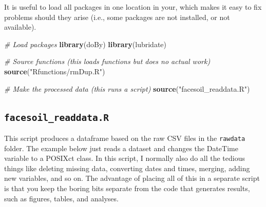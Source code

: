 \documentclass[]{book}
\newenvironment{Shaded}{\begin{snugshade}}{\end{snugshade}}
\newcommand{\CommentTok}[1]{\textcolor[rgb]{0.56,0.35,0.01}{\textit{#1}}}
\newcommand{\KeywordTok}[1]{\textcolor[rgb]{0.13,0.29,0.53}{\textbf{#1}}}
\newcommand{\NormalTok}[1]{#1}
\newcommand{\OperatorTok}[1]{\textcolor[rgb]{0.81,0.36,0.00}{\textbf{#1}}}
\newcommand{\StringTok}[1]{\textcolor[rgb]{0.31,0.60,0.02}{#1}}
\begin{document}
It is useful to load all packages in one location in your, which makes it easy to fix problems should they arise (i.e., some packages are not installed, or not available).

\begin{Shaded}
\begin{Highlighting}[]
\CommentTok{# Load packages}
\KeywordTok{library}\NormalTok{(doBy)}
\KeywordTok{library}\NormalTok{(lubridate)}

\CommentTok{# Source functions (this loads functions but does no actual work)}
\KeywordTok{source}\NormalTok{(}\StringTok{"Rfunctions/rmDup.R"}\NormalTok{)}

\CommentTok{# Make the processed data (this runs a script)}
\KeywordTok{source}\NormalTok{(}\StringTok{"facesoil_readdata.R"}\NormalTok{)}
\end{Highlighting}
\end{Shaded}

\hypertarget{facesoil_readdata.r}{%
\subsection{\texorpdfstring{\texttt{facesoil\_readdata.R}}{facesoil\_readdata.R}}\label{facesoil_readdata.r}}

This script produces a dataframe based on the raw CSV files in the \texttt{rawdata} folder. The example below just reads a dataset and changes the DateTime variable to a POSIXct class. In this script, I normally also do all the tedious things like deleting missing data, converting dates and times, merging, adding new variables, and so on. The advantage of placing all of this in a separate script is that you keep the boring bits separate from the code that generates results, such as figures, tables, and analyses.

\begin{Shaded}
\end{Shaded}
\end{document}
